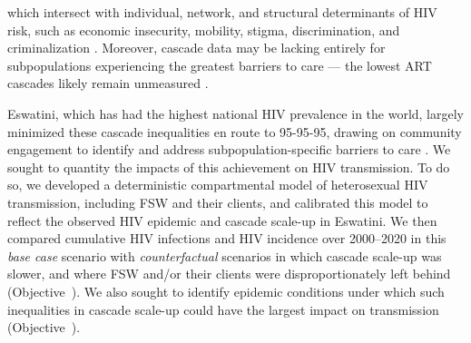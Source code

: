 which intersect with individual, network, and structural determinants of HIV risk,
such as economic insecurity, mobility, stigma, discrimination, and criminalization
\cite{Lancaster2016sr,Wanyenze2016,Schwartz2017,Schmidt-Sane2022}.
Moreover, cascade data may be lacking entirely
for subpopulations experiencing the greatest barriers to care
--- \ie the lowest ART cascades likely remain unmeasured \cite{Hakim2018}.
\par
Eswatini, which has had the highest national HIV prevalence in the world,
largely minimized these cascade inequalities en route to 95-95-95,
drawing on community engagement to identify and address
subpopulation-specific barriers to care \cite{Walsh2020,SHIMS3,EswIBBS2022}.
We sought to quantity the impacts of this achievement on HIV transmission. %
To do so, we developed a deterministic compartmental model
of heterosexual HIV transmission, including FSW and their clients,
and calibrated this model to reflect
the observed HIV epidemic and cascade scale-up in Eswatini.
We then compared cumulative HIV infections and HIV incidence over 2000--2020
in this \emph{base case} scenario
with \emph{counterfactual} scenarios
in which cascade scale-up was slower,
and where FSW and/or their clients were disproportionately left behind
(Objective~).
We also sought to identify epidemic conditions under which
such inequalities in cascade scale-up
could have the largest impact on transmission
(Objective~).
